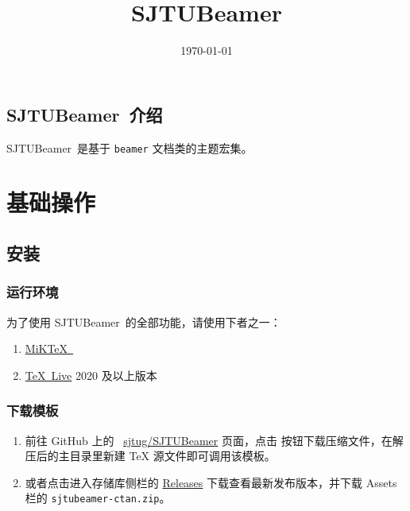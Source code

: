 \documentclass[
    UTF8,
    heading=true,
    12pt
]{ctexrep}
\def\themename{\textsf{SJTUBeamer}}
\begin{document}
    \title{\themename}
    \date{\today}

    \chapter*{\themename\ 介绍}

    \themename\ 是基于 \verb"beamer" 文档类的主题宏集。

    \part{基础操作}
    \chapter{安装}

    \section{运行环境}

    为了使用 \themename\ 的全部功能，请使用下者之一：
    \begin{enumerate}
        \item \href{https://miktex.org/}{MiK\TeX\ }
        \item \href{https://mirrors.sjtug.sjtu.edu.cn/ctan/systems/texlive/Images/texlive2021-20210325.iso}{\TeX\ Live} 2020 及以上版本
    \end{enumerate}

    \section{下载模板}

    \begin{enumerate}
        \item 前往 GitHub 上的 \faGithub{}~\href{https://github.com/sjtug/SJTUBeamer}{sjtug/SJTUBeamer} 页面，点击  按钮下载压缩文件，在解压后的主目录里新建 \TeX{} 源文件即可调用该模板。
        \item 或者点击进入存储库侧栏的 \href{https://github.com/sjtug/SJTUBeamer/releases}{\textsf{Releases}} 下载查看最新发布版本，并下载 \textsf{Assets} 栏的 \texttt{sjtubeamer-ctan.zip}。
    \end{enumerate}
    
\end{document}
